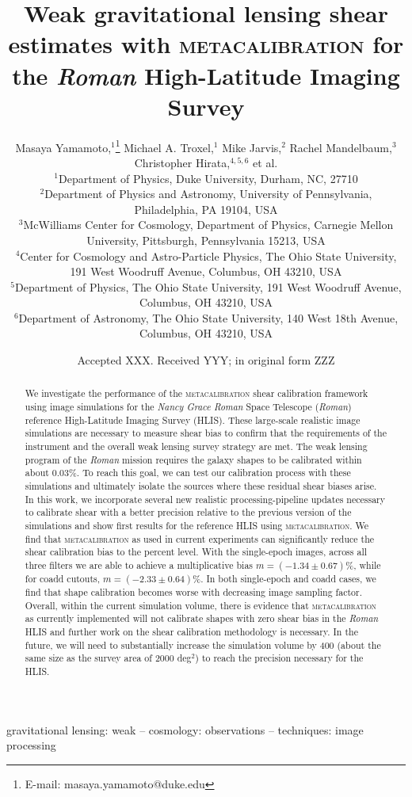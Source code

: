 \documentclass[fleqn,usenatbib]{mnras}
\title[Metacalibration for the Roman High-Latitude Imaging Survey]{Weak gravitational lensing shear estimates with \textsc{metacalibration} for the \emph{Roman} High-Latitude Imaging Survey}
\author[M. Yamamoto et al.]{
Masaya Yamamoto,$^{1}$\thanks{E-mail: masaya.yamamoto@duke.edu}
Michael A. Troxel,$^{1}$
Mike Jarvis,$^{2}$
Rachel Mandelbaum,$^{3}$
Christopher Hirata,$^{4,5,6}$
 et al.\\
$^{1}$Department of Physics, Duke University, Durham, NC, 27710\\
$^{2}$Department of Physics and Astronomy, University of Pennsylvania, Philadelphia, PA 19104, USA\\
$^{3}$McWilliams Center for Cosmology, Department of Physics, Carnegie Mellon University, Pittsburgh, Pennsylvania 15213, USA\\
$^{4}$Center for Cosmology and Astro-Particle Physics, The Ohio State University, 191 West Woodruff Avenue, Columbus, OH 43210, USA\\
$^{5}$Department of Physics, The Ohio State University, 191 West Woodruff Avenue, Columbus, OH 43210, USA\\
$^{6}$Department of Astronomy, The Ohio State University, 140 West 18th Avenue, Columbus, OH 43210, USA\\
}
\date{Accepted XXX. Received YYY; in original form ZZZ}
\begin{document}
\label{firstpage}
\pagerange{\pageref{firstpage}--\pageref{lastpage}}
\maketitle

\begin{abstract}
We investigate the performance of the \textsc{metacalibration} shear calibration framework using image simulations for the \emph{Nancy Grace Roman} Space Telescope (\emph{Roman}) reference High-Latitude Imaging Survey (HLIS). These large-scale realistic image simulations are necessary to measure shear bias to confirm that the requirements of the instrument and the overall weak lensing survey strategy are met. The weak lensing program of the \emph{Roman} mission requires the galaxy shapes to be calibrated within about 0.03\%. To reach this goal, we can test our calibration process with these simulations and ultimately isolate the sources where these residual shear biases arise. In this work, we incorporate several new realistic processing-pipeline updates necessary to calibrate shear with a better precision relative to the previous version of the simulations and show first results for the reference HLIS using \textsc{metacalibration}. We find that \textsc{metacalibration} as used in current experiments can significantly reduce the shear calibration bias to the percent level. With the single-epoch images, across all three filters we are able to achieve a multiplicative bias $m=(-1.34\pm 0.67)$\%, while for coadd cutouts, $m=(-2.33\pm 0.64)$\%. In both single-epoch and coadd cases, we find that shape calibration becomes worse with decreasing image sampling factor. Overall, within the current simulation volume, there is evidence that \textsc{metacalibration} as currently implemented will not calibrate shapes with zero shear bias in the \emph{Roman} HLIS and further work on the shear calibration methodology is necessary. In the future, we will need to substantially increase the simulation volume by 400 (about the same size as the survey area of 2000 deg$^{2}$) to reach the precision necessary for the HLIS.
\end{abstract}

\begin{keywords}
gravitational lensing: weak -- cosmology: observations -- techniques: image processing
\end{keywords}
\end{document}
